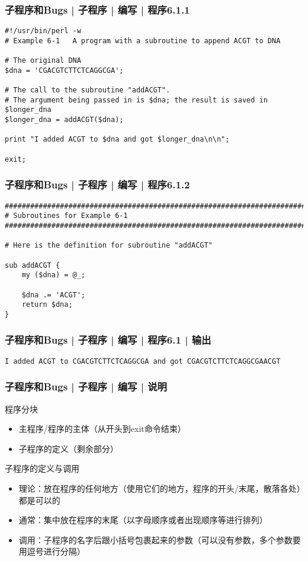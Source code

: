 \begin{frame}[fragile]
  \frametitle{子程序和Bugs | 子程序 | 编写 | 程序6.1.1}
\begin{lstlisting}
#!/usr/bin/perl -w
# Example 6-1   A program with a subroutine to append ACGT to DNA

# The original DNA
$dna = 'CGACGTCTTCTCAGGCGA';

# The call to the subroutine "addACGT".
# The argument being passed in is $dna; the result is saved in $longer_dna
$longer_dna = addACGT($dna);

print "I added ACGT to $dna and got $longer_dna\n\n";

exit;
\end{lstlisting}
\end{frame}

\begin{frame}[fragile]
  \frametitle{子程序和Bugs | 子程序 | 编写 | 程序6.1.2}
\begin{lstlisting}[firstnumber=15,basicstyle=\small\tt]
################################################################################
# Subroutines for Example 6-1
################################################################################

# Here is the definition for subroutine "addACGT"

sub addACGT {
    my ($dna) = @_;

    $dna .= 'ACGT';
    return $dna;
}
\end{lstlisting}
\end{frame}

\begin{frame}[fragile]
  \frametitle{子程序和Bugs | 子程序 | 编写 | 程序6.1 | 输出}
\begin{lstlisting}
I added ACGT to CGACGTCTTCTCAGGCGA and got CGACGTCTTCTCAGGCGAACGT
\end{lstlisting}
\end{frame}

\begin{frame}
  \frametitle{子程序和Bugs | 子程序 | 编写 | \alert{说明}}
  \begin{block}{程序分块}
    \begin{itemize}
      \item 主程序/程序的主体（从开头到exit命令结束）
      \item 子程序的定义（剩余部分）
    \end{itemize}
  \end{block}
  \pause
  \begin{block}{子程序的定义与调用}
    \begin{itemize}
      \item 理论：放在程序的任何地方（使用它们的地方，程序的开头/末尾，散落各处）都是可以的
      \item 通常：集中放在程序的末尾（以字母顺序或者出现顺序等进行排列）
      \item 调用：子程序的名字后跟小括号包裹起来的参数（可以没有参数，多个参数要用逗号进行分隔）
    \end{itemize}
  \end{block}
\end{frame}

